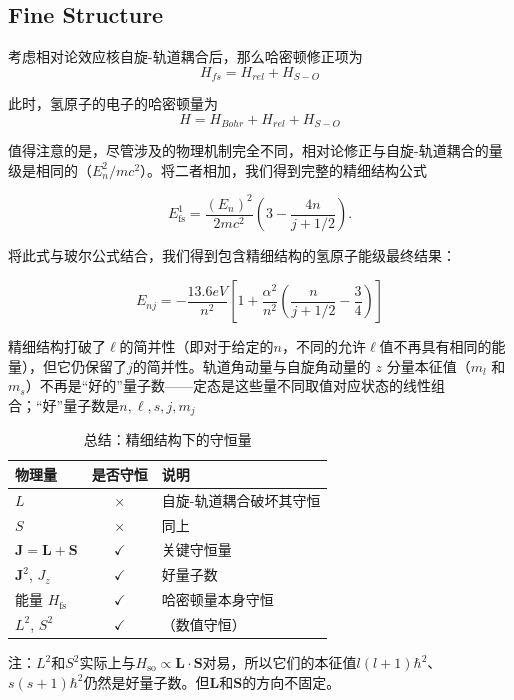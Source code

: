 \subsection{Fine Structure}
考虑相对论效应核自旋-轨道耦合后，那么哈密顿修正项为
\[{H_{fs}} = {H_{rel}} + {H_{S - O}}\]

此时，氢原子的电子的哈密顿量为
\[H = {H_{Bohr}} + {H_{rel}} + {H_{S - O}}\]

值得注意的是，尽管涉及的物理机制完全不同，相对论修正与自旋-轨道耦合的量级是相同的（\(E_n^2/mc^2\)）。将二者相加，我们得到完整的精细结构公式

\begin{equation}
	E_{\text{fs}}^1 = \frac{(E_n)^2}{2mc^2} \left( 3 - \frac{4n}{j + 1/2} \right). 
\end{equation}

将此式与玻尔公式结合，我们得到包含精细结构的氢原子能级最终结果：

\begin{equation}
	{E_{nj}} =  - \frac{{13.6eV}}{{{n^2}}}\left[ {1 + \frac{{{\alpha ^2}}}{{{n^2}}}\left( {\frac{n}{{j + 1/2}} - \frac{3}{4}} \right)} \right]
\end{equation}

精细结构打破了\(\ell\)的简并性（即对于给定的\(n\)，不同的允许\(\ell\)值不再具有相同的能量），但它仍保留了\(j\)的简并性。轨道角动量与自旋角动量的 \(z\) 分量本征值（\(m_l\) 和 \(m_s\)）不再是“好的”量子数——定态是这些量不同取值对应状态的线性组合；“好”量子数是$n,\ell ,s,j,{m_j}$
\begin{table}[htbp]
	\centering
	\caption{总结：精细结构下的守恒量}
	\begin{tabular}{l c l}
		\toprule
		物理量 & 是否守恒 & 说明 \\
		\midrule
		$L$ & $\times$ & 自旋-轨道耦合破坏其守恒 \\
		$S$ & $\times$ & 同上 \\
		$\mathbf{J}=\mathbf{L}+\mathbf{S}$ & $\checkmark$ & 关键守恒量 \\
		$\mathbf{J}^{2}$, $J_{z}$ & $\checkmark$ & 好量子数 \\
		能量 $H_{\text{fs}}$ & $\checkmark$ & 哈密顿量本身守恒 \\
		$L^{2}$, $S^{2}$ & $\checkmark$ & （数值守恒） \\
		\bottomrule
	\end{tabular}
	
	\vspace{0.5em}
	\footnotesize
	注：$L^{2}$和$S^{2}$实际上与$H_{\text{so}}\propto\mathbf{L}\cdot\mathbf{S}$对易，所以它们的本征值$l(l+1)\hbar^{2}$、$s(s+1)\hbar^{2}$仍然是好量子数。但$\mathbf{L}$和$\mathbf{S}$的方向不固定。
\end{table}
